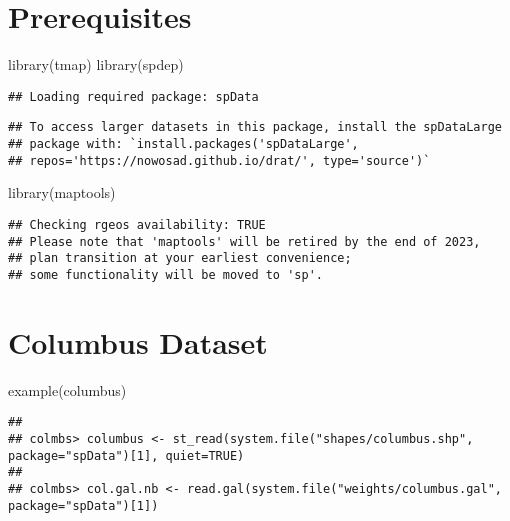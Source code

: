 \documentclass[
]{book}
\newenvironment{Shaded}{\begin{snugshade}}{\end{snugshade}}
\newcommand{\FunctionTok}[1]{\textcolor[rgb]{0.00,0.00,0.00}{#1}}
\newcommand{\NormalTok}[1]{#1}
\begin{document}
\hypertarget{prerequisites-1}{%
\section{Prerequisites}\label{prerequisites-1}}

\begin{Shaded}
\begin{Highlighting}[]
\FunctionTok{library}\NormalTok{(tmap)}
\FunctionTok{library}\NormalTok{(spdep)}
\end{Highlighting}
\end{Shaded}

\begin{verbatim}
## Loading required package: spData
\end{verbatim}

\begin{verbatim}
## To access larger datasets in this package, install the spDataLarge
## package with: `install.packages('spDataLarge',
## repos='https://nowosad.github.io/drat/', type='source')`
\end{verbatim}

\begin{Shaded}
\begin{Highlighting}[]
\FunctionTok{library}\NormalTok{(maptools)}
\end{Highlighting}
\end{Shaded}

\begin{verbatim}
## Checking rgeos availability: TRUE
## Please note that 'maptools' will be retired by the end of 2023,
## plan transition at your earliest convenience;
## some functionality will be moved to 'sp'.
\end{verbatim}

\hypertarget{columbus-dataset}{%
\section{Columbus Dataset}\label{columbus-dataset}}

\begin{Shaded}
\begin{Highlighting}[]
\FunctionTok{example}\NormalTok{(columbus)}
\end{Highlighting}
\end{Shaded}

\begin{verbatim}
## 
## colmbs> columbus <- st_read(system.file("shapes/columbus.shp", package="spData")[1], quiet=TRUE)
## 
## colmbs> col.gal.nb <- read.gal(system.file("weights/columbus.gal", package="spData")[1])
\end{verbatim}
\end{document}
